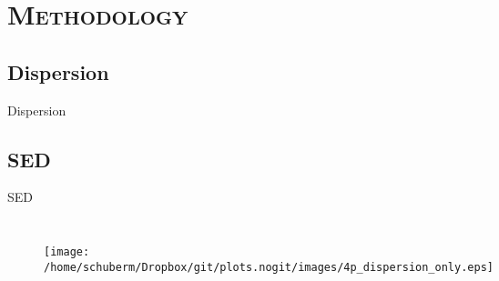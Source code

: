 \documentclass[xcolor=x11names,compress]{beamer}
\renewcommand{\(}{\begin{columns}}
\renewcommand{\)}{\end{columns}}
\newcommand{\<}[1]{\begin{column}{#1}}
\renewcommand{\>}{\end{column}}
\begin{document}
\section{\scshape Methodology}
\subsection{Dispersion}
\begin{frame}{\small{Dispersion}}
\begin{figure}[!h]
\vspace*{-0.5cm}
\begin{center}
\renewcommand{\figure}{Fig.}
\label{fig:sed}
\end{center}
\end{figure}
\begin{figure}[!h]
\vspace*{-0.25cm}
\begin{center}
\renewcommand{\figure}{Fig.}
\label{fig:dispersion}
\end{center}
\end{figure}
\end{frame}


\subsection{SED}
\begin{frame}{SED}
\begin{columns}
\begin{figure}[t]
\vspace*{-1cm}
\texttt{[image: /home/schuberm/Dropbox/git/plots.nogit/images/4p\_dispersion\_only.eps]}
\renewcommand{\figure}{Fig.}
\label{fig:disp_4p}
\end{figure}
\begin{figure}[t]
\vspace*{-1cm}
\renewcommand{\figure}{Fig.}
\label{fig:sed}
\end{figure}
\end{columns}
\end{frame}
\end{document}

